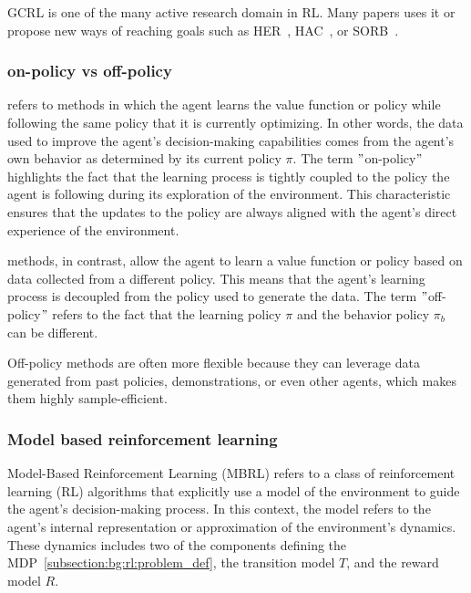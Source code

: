 GCRL is one of the many active research domain in RL.
Many papers uses it or propose new ways of reaching goals such as HER~\citep{andrychowicz2017hindsight},
HAC~\cite{levy2019learning}, or SORB~\cite{eysenbach2019search}.


\subsubsection{on-policy vs off-policy}\label{subsection:bg:rl:on-off-policy}

 refers to methods in which the agent learns the value function or policy while
following the same policy that it is currently optimizing.
In other words, the data used to improve the agent's decision-making capabilities comes from the agent’s own behavior
as determined by its current policy $\pi$.
The term \("\)on-policy\("\) highlights the fact that the learning process is tightly coupled to the policy the agent is
following during its exploration of the environment.
This characteristic ensures that the updates to the policy are always aligned with the agent's direct experience of the
environment.

 methods, in contrast, allow the agent to learn a value function or policy based on
data collected from a different policy.
This means that the agent's learning process is decoupled from the policy used to generate the data.
The term \("\)off-policy\("\) refers to the fact that the learning policy $\pi$ and the behavior policy $\pi_b$ can be
different.

Off-policy methods are often more flexible because they can leverage data generated from past policies, demonstrations,
or even other agents, which makes them highly sample-efficient.

\subsubsection{Model based reinforcement learning}

Model-Based Reinforcement Learning (MBRL) refers to a class of reinforcement learning (RL) algorithms that explicitly
use a model of the environment to guide the agent's decision-making process.
In this context, the model refers to the agent's internal representation or approximation of the environment's dynamics.
These dynamics includes two of the components defining the MDP~\ref{subsection:bg:rl:problem_def}, the transition model $T$,
and the reward model $R$.

